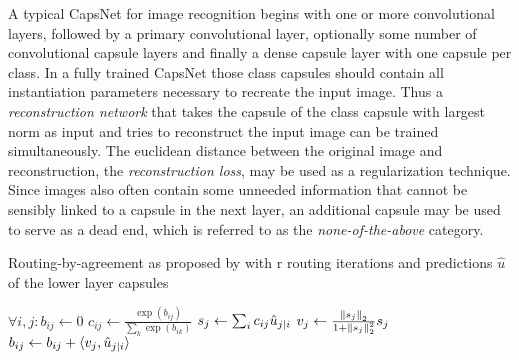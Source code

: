 A typical CapsNet for image recognition begins with one or more convolutional layers, followed by a primary convolutional layer, optionally some number of convolutional capsule layers and finally a dense capsule layer with one capsule per class.
In a fully trained CapsNet those class capsules should contain all instantiation parameters necessary to recreate the input image.
Thus a \emph{reconstruction network} that takes the capsule of the class capsule with largest norm as input and tries to reconstruct the input image can be trained simultaneously.
The euclidean distance between the original image and reconstruction, the \emph{reconstruction loss}, may be used as a regularization technique.
Since images also often contain some unneeded information that cannot be sensibly linked to a capsule in the next layer, an additional capsule may be used to serve as a dead end, which is referred to as the \emph{none-of-the-above} category.

\begin{algorithm}
\caption[Routing-by-agreement]{Routing-by-agreement as proposed by \citet{capsules} with r routing iterations and predictions $\hat{u}$ of the lower layer capsules}
\label{alg:routing}
\begin{algorithmic}[1]
	
	\State $\forall i,j: b_{ij} \gets 0$
		\State $c_{ij} \gets \frac{\exp(b_{ij})}{\sum_{k}{\exp(b_{ik})}}$ 
		\State $s_j \gets \sum_{i}{c_{ij}\hat{u}_{j \vert i}}$
		\State $v_j \gets \frac{\left \lVert s_j \right \rVert _{2}}{1 + \left \lVert s_j \right \rVert _{2}^2} s_j$ 
		\State $b_{ij} \gets b_{ij} + \langle v_j, \hat{u}_{j \vert i} \rangle$	
	\EndFor
\EndProcedure
	
\end{algorithmic}
\end{algorithm}

